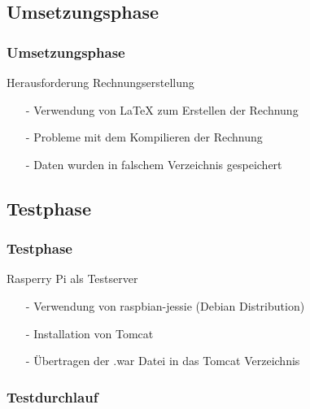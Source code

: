 \documentclass[12pt]{beamer}
\begin{document}
\subsection{Umsetzungsphase}
\begin{frame}
\frametitle{Umsetzungsphase}

\begin{Large}
Herausforderung Rechnungserstellung \vspace{0.2 cm}
\end{Large}

\begin{itemize}
	\item[-] Verwendung von \LaTeX \hspace{0.05 cm} zum Erstellen der Rechnung
	\item[-] Probleme mit dem Kompilieren der Rechnung
	\item[-] Daten wurden in falschem Verzeichnis gespeichert
\end{itemize}

\end{frame}




\subsection{Testphase}

\begin{frame}
\frametitle{Testphase}

\begin{Large}
	Rasperry Pi als Testserver \vspace{0.2 cm}
\end{Large}
	\begin{itemize}
		\item[-] Verwendung von raspbian-jessie (Debian Distribution)
		\item[-] Installation von Tomcat 
		\item[-] Übertragen der .war Datei in das Tomcat Verzeichnis 
	\end{itemize}
\end{frame}

\subsubsection{Testdurchlauf}
\end{document}
